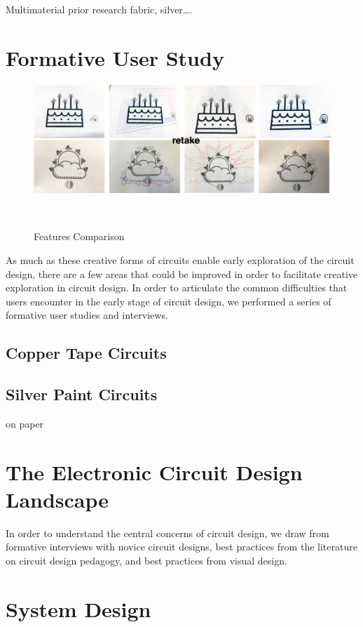 \documentclass{sigchi}
\begin{document}
Multimaterial prior research 
fabric, silver….
\section{Formative User Study}
\begin{figure}
\centering
  \includegraphics[width=1\columnwidth]{figures/formative_user_design}
  \caption{Features Comparison}~\label{fig:formative_user_design}
\end{figure}

As much as these creative forms of circuits enable early exploration of the circuit design, there are a few areas that could be improved in order to facilitate creative exploration in circuit design. In order to articulate the common difficulties that users encounter in the early stage of circuit design, we performed a series of formative user studies and interviews. 

\subsection{Copper Tape Circuits}
\subsection{Silver Paint Circuits}
on paper


\section{The Electronic Circuit Design Landscape}
In order to understand the central concerns of circuit design, we draw from formative interviews with novice circuit designs, best practices from the literature on circuit design pedagogy, and best practices from visual design.

\section{System Design}
\end{document}
